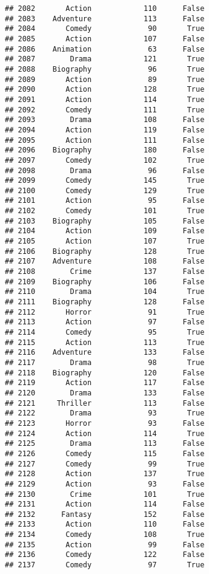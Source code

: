 \documentclass[
]{article}
\begin{document}
\begin{verbatim}
## 2082       Action            110      False
## 2083    Adventure            113      False
## 2084       Comedy             90       True
## 2085       Action            107      False
## 2086    Animation             63      False
## 2087        Drama            121       True
## 2088    Biography             96       True
## 2089       Action             89       True
## 2090       Action            128       True
## 2091       Action            114       True
## 2092       Comedy            111       True
## 2093        Drama            108      False
## 2094       Action            119      False
## 2095       Action            111      False
## 2096    Biography            180      False
## 2097       Comedy            102       True
## 2098        Drama             96      False
## 2099       Comedy            145       True
## 2100       Comedy            129       True
## 2101       Action             95      False
## 2102       Comedy            101       True
## 2103    Biography            105      False
## 2104       Action            109      False
## 2105       Action            107       True
## 2106    Biography            128       True
## 2107    Adventure            108      False
## 2108        Crime            137      False
## 2109    Biography            106      False
## 2110        Drama            104       True
## 2111    Biography            128      False
## 2112       Horror             91       True
## 2113       Action             97      False
## 2114       Comedy             95       True
## 2115       Action            113       True
## 2116    Adventure            133      False
## 2117        Drama             98       True
## 2118    Biography            120      False
## 2119       Action            117      False
## 2120        Drama            133      False
## 2121     Thriller            113      False
## 2122        Drama             93       True
## 2123       Horror             93      False
## 2124       Action            114       True
## 2125        Drama            113      False
## 2126       Comedy            115      False
## 2127       Comedy             99       True
## 2128       Action            137       True
## 2129       Action             93      False
## 2130        Crime            101       True
## 2131       Action            114      False
## 2132      Fantasy            152      False
## 2133       Action            110      False
## 2134       Comedy            108       True
## 2135       Action             99      False
## 2136       Comedy            122      False
## 2137       Comedy             97       True

\end{verbatim}
\end{document}
